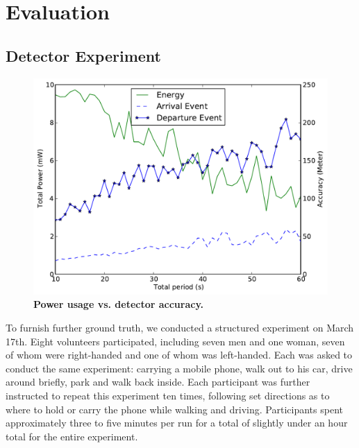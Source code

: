 \section{Evaluation}
\label{sec-evaluation}



\subsection{Detector Experiment}

\begin{figure}
\centering
\includegraphics[width=\columnwidth]{./figures/Energy_accuracy.pdf}

\caption{\textbf{Power usage vs. detector accuracy.} }

\label{fig-energy}
\end{figure}



To furnish further ground truth, we conducted a structured experiment on March
17th. Eight volunteers participated, including seven men and one woman, seven 
of whom were right-handed and one of whom was left-handed.
Each was asked to conduct the same experiment:  carrying a mobile phone, walk
out to his car, drive around briefly, park and walk back inside.  Each
participant was further instructed to repeat this experiment ten times,
following set directions as to where to hold or carry the phone while walking
and driving.  Participants spent approximately three to five minutes per run
for a total of slightly under an hour total for the entire experiment.

